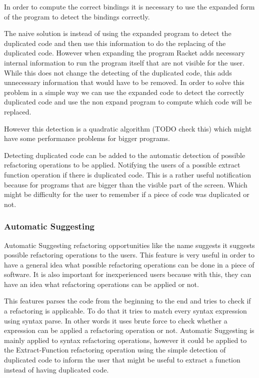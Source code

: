 
In order to compute the correct bindings it is necessary to use the expanded form
of the program to detect the bindings correctly.

The naive solution is instead of using the expanded program to detect the duplicated
 code and then use this information to do the replacing of the duplicated code.
However when expanding the program Racket adds necessary internal information to
run the program itself that are not visible for the user.
While this does not change the detecting of the duplicated code, this adds unnecessary information
that would have to be removed.
In order to solve this problem in a simple way we can use the expanded code to detect
the correctly duplicated code and use the non expand program
to compute which code will be replaced.

However this detection is a quadratic algorithm (TODO check this) which might
have some performance problems for bigger programs.

Detecting duplicated code can be added to the automatic detection of possible refactoring operations to be applied.
Notifying the users of a possible extract function operation if there is duplicated code.
This is a rather useful notification because for programs that are bigger than the
visible part of the screen.
Which might be difficulty for the user to remember if a piece of code was duplicated or not.



\subsubsection{Automatic Suggesting}
Automatic Suggesting refactoring opportunities like the name suggests it suggests
possible refactoring operations to the users.
This feature is very useful in order to have a general idea what possible refactoring
operations can be done in a piece of software.
It is also important for inexperienced users because with this,
they can have an idea what refactoring operations can be applied or not.


This features parses the code from the beginning to the end and tries to check
if a refactoring is applicable.
To do that it tries to match every syntax expression using syntax parse.
In other words it uses brute force to check whether a expression can be applied
a refactoring operation or not.
Automatic Suggesting is mainly applied to syntax refactoring operations, however
it could be applied to the Extract-Function refactoring operation using the
simple detection of duplicated code to inform the user that might be useful
to extract a function instead of having duplicated code.

